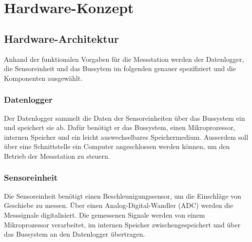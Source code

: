 %
%

\chapter{Hardware-Konzept}\label{chap.hardware}



\section{Hardware-Architektur}\label{sec.hw_arch}

Anhand der funktionalen Vorgaben für die Messstation werden der Datenlogger, die Sensoreinheit und das Bussytem im folgenden genauer spezifiziert und die Komponenten ausgewählt.

\subsection{Datenlogger}
Der Datenlogger sammelt die Daten der Sensoreinheiten über das Bussystem ein und speichert sie ab. Dafür benötigt er das Bussystem, einen Mikroprozessor, internen Speicher und ein leicht auswechselbares Speichermedium. Ausserdem soll über eine Schnittstelle ein Computer angeschlossen werden können, um den Betrieb der Messstation zu steuern.

\subsection{Sensoreinheit}
Die Sensoreinheit benötigt einen Beschleunigungssensor, um die Einschläge von Geschiebe zu messen. Über einen Analog-Digital-Wandler (ADC) werden die Messsignale digitalisiert. Die gemessenen Signale werden von einem Mikroprozessor verarbeitet, im internen Speicher zwischengespeichert und über das Bussystem an den Datenlogger übertragen.

